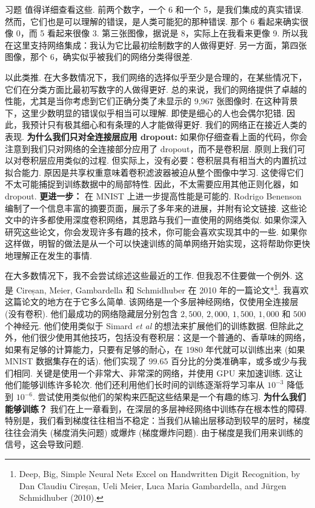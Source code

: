 \begin{exerciseBox}{习题}
\noindent 值得详细查看这些. 前两个数字，一个 6 和一个 5，是我们集成的真实错误. 然而，它们也是可以理解的错误，是人类可能犯的那种错误. 那个 6 看起来确实很像 0，而 5 看起来很像 3. 第三张图像，据说是 8，实际上在我看来更像 9. 所以我在这里支持网络集成：我认为它比最初绘制数字的人做得更好. 另一方面，第四张图像，那个 6，确实似乎被我们的网络分类得很差.

以此类推. 在大多数情况下，我们网络的选择似乎至少是合理的，在某些情况下，它们在分类方面比最初写数字的人做得更好. 总的来说，我们的网络提供了卓越的性能，尤其是当你考虑到它们正确分类了未显示的 9,967 张图像时. 在这种背景下，这里少数明显的错误似乎相当可以理解. 即使是细心的人也会偶尔犯错. 因此，我预计只有极其细心和有条理的人才能做得更好. 我们的网络正在接近人类的表现. \textbf{为什么我们只对全连接层应用 dropout:} 如果你仔细查看上面的代码，你会注意到我们只对网络的全连接部分应用了 dropout，而不是卷积层. 原则上我们可以对卷积层应用类似的过程. 但实际上，没有必要：卷积层具有相当大的内置抗过拟合能力. 原因是共享权重意味着卷积滤波器被迫从整个图像中学习. 这使得它们不太可能捕捉到训练数据中的局部特性. 因此，不太需要应用其他正则化器，如 dropout. \textbf{更进一步：} 在 MNIST 上进一步提高性能是可能的. Rodrigo Benenson 编制了一个信息丰富的摘要页面，展示了多年来的进展，并附有论文链接. 这些论文中的许多都使用深度卷积网络，其思路与我们一直使用的网络类似. 如果你深入研究这些论文，你会发现许多有趣的技术，你可能会喜欢实现其中的一些. 如果你这样做，明智的做法是从一个可以快速训练的简单网络开始实现，这将帮助你更快地理解正在发生的事情.

在大多数情况下，我不会尝试综述这些最近的工作. 但我忍不住要做一个例外. 这是 Cireșan, Meier, Gambardella 和 Schmidhuber 在 2010 年的一篇论文*\footnote{Deep, Big, Simple Neural Nets Excel on Handwritten Digit Recognition, by Dan Claudiu Cireșan, Ueli Meier, Luca Maria Gambardella, and Jürgen Schmidhuber (2010).}. 我喜欢这篇论文的地方在于它多么简单. 该网络是一个多层神经网络，仅使用全连接层 (没有卷积). 他们最成功的网络隐藏层分别包含 $2,500$, $2,000$, $1,500$, $1,000$ 和 $500$ 个神经元. 他们使用类似于 Simard \emph{et al} 的想法来扩展他们的训练数据. 但除此之外，他们很少使用其他技巧，包括没有卷积层：这是一个普通的、香草味的网络，如果有足够的计算能力，只要有足够的耐心，在 1980 年代就可以训练出来 (如果 MNIST 数据集存在的话). 他们实现了 $99.65$ 百分比的分类准确率，或多或少与我们相同. 关键是使用一个非常大、非常深的网络，并使用 GPU 来加速训练. 这让他们能够训练许多轮次. 他们还利用他们长时间的训练逐渐将学习率从 $10^{-3}$ 降低到 $10^{-6}$. 尝试使用类似他们的架构来匹配这些结果是一个有趣的练习. \textbf{为什么我们能够训练？} 我们在上一章看到，在深层的多层神经网络中训练存在根本性的障碍. 特别是，我们看到梯度往往相当不稳定：当我们从输出层移动到较早的层时，梯度往往会消失 (梯度消失问题) 或爆炸 (梯度爆炸问题). 由于梯度是我们用来训练的信号，这会导致问题.


\end{exerciseBox}
